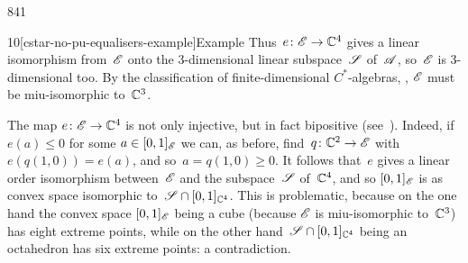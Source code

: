\begin{parsec}{841}
\begin{point}{10}[cstar-no-pu-equalisers-example]{Example}
Thus~$e\colon \mathscr{E}\to \mathbb{C}^4$
gives a linear isomorphism from~$\mathscr{E}$
onto the 3-dimensional linear subspace~$\mathscr{S}$ of~$\mathscr{A}$,
so~$\mathscr{E}$ is 3-dimensional too.
By the classification of finite-dimensional
$C^*$-algebras, , 
$\mathscr{E}$ must be miu-isomorphic to~$\mathbb{C}^3$.

The map $e\colon \mathscr{E}\to\mathbb{C}^4$
is not only injective,
but in fact bipositive (see~).
Indeed,  if $e(a)\leq 0$ for some $a\in[0,1]_{\mathscr{E}}$
we can, as before,
find~$q\colon \mathbb{C}^2 \to \mathscr{E}$
with $e(q(1,0))=e(a)$,
and so~$a=q(1,0)\geq 0$.
It follows that~$e$ gives a linear order isomorphism
between~$\mathscr{E}$ and the subspace~$\mathscr{S}$ of~$\mathbb{C}^4$,
and so $[0,1]_{\mathscr{E}}$ is as convex space
isomorphic to~$\mathscr{S}\cap[0,1]_{\mathbb{C}^4}$.
This is problematic,
because on the one
hand
the convex space $[0,1]_{\mathscr{E}}$ being a cube
(because
$\mathscr{E}$ is miu-isomorphic to~$\mathbb{C}^3$)
has eight extreme points,
while on the other 
hand~$\mathscr{S}\cap[0,1]_{\mathbb{C}^4}$ being
an octahedron
has six extreme points: a contradiction.
\end{point}
\end{parsec}
